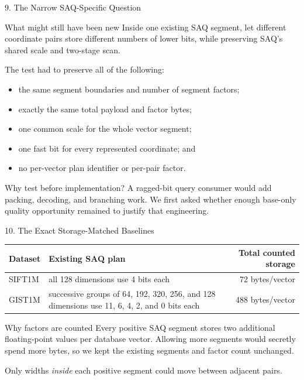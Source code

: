 \documentclass[aspectratio=169]{beamer}
\begin{document}
\begin{frame}{9. The Narrow SAQ-Specific Question}
\begin{block}{What might still have been new}
Inside one existing SAQ segment, let different coordinate pairs store
different numbers of lower bits, while preserving SAQ's shared scale and
two-stage scan.
\end{block}
The test had to preserve all of the following:
\begin{itemize}
  \item the same segment boundaries and number of segment factors;
  \item exactly the same total payload and factor bytes;
  \item one common scale for the whole vector segment;
  \item one fast bit for every represented coordinate; and
  \item no per-vector plan identifier or per-pair factor.
\end{itemize}
\begin{alertblock}{Why test before implementation?}
A ragged-bit query consumer would add packing, decoding, and branching work.
We first asked whether enough base-only quality opportunity remained to justify
that engineering.
\end{alertblock}
\end{frame}

\begin{frame}{10. The Exact Storage-Matched Baselines}
\small
\begin{center}
\begin{tabularx}{\textwidth}{lXr}
\toprule
Dataset & Existing SAQ plan & Total counted storage\\
\midrule
SIFT1M & all 128 dimensions use 4 bits each & 72 bytes/vector\\
GIST1M & successive groups of 64, 192, 320, 256, and 128 dimensions use
11, 6, 4, 2, and 0 bits each & 488 bytes/vector\\
\bottomrule
\end{tabularx}
\end{center}
\begin{block}{Why factors are counted}
Every positive SAQ segment stores two additional floating-point values per
database vector. Allowing more segments would secretly spend more bytes, so
we kept the existing segments and factor count unchanged.
\end{block}
Only widths \emph{inside} each positive segment could move between adjacent
pairs.
\end{frame}
\end{document}
